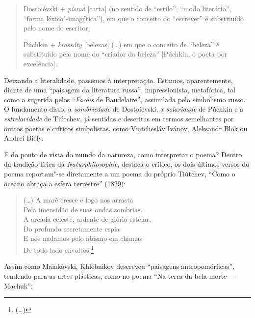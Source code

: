 \begin{quotation}
Dostoiévski + \emph{pismó} [carta] (no sentido de ``estilo'', ``modo literário'', ``forma
léxico"-imagética''), em que o conceito do ``escrever'' é substituído pelo
nome do escritor;

Púchkin + \emph{krassóty} [belezas] (\ldots{}) em que o conceito de ``beleza'' é substituído
pelo nome do ``criador da beleza'' [Púchkin, o poeta por excelência].
\end{quotation}

Deixando a literalidade, passemos à interpretação.
Estamos, aparentemente, diante de uma ``paisagem da literatura russa'',
impressionista, metafórica, tal como a sugerida pelos ``\emph{Faróis} de
Baudelaire'', assimilada pelo simbolismo russo. O fundamento disso: a
\emph{sombriedade} de Dostoiévski, a \emph{solaridade} de Púchkin e a
\emph{estrelaridade} de Tiútchev, já sentidas e descritas
em termos semelhantes por outros poetas e críticos simbolistas, como Viatchesláv
Ivánov, Aleksandr Blok ou Andrei Biély. 

E do ponto de vista do mundo da natureza, como interpretar o poema?
Dentro da tradição lírica da \emph{Naturphilosophie}, destaca o crítico, os dois últimos
versos do poema reportam"-se diretamente a um poema do próprio Tiútchev,
``Como o oceano abraça a esfera terrestre'' (1829):

\begin{verse}
(\ldots{})
A maré cresce e logo nos arrasta \\
Pela imensidão de suas ondas sombrias. \\
A arcada celeste, ardente de glória estelar, \\
Do profundo secretamente espia \\
E nós nadamos pelo abismo em chamas \\
De todo lado envoltos.\footnote{(\ldots{}) {}}

\end{verse}

Assim como Maiakóvski, Khlébnikov descreveu ``paisagens
antropomórficas'', tendendo para as artes plásticas, como no poema ``Na
terra da bela morte --- Machuk'':

